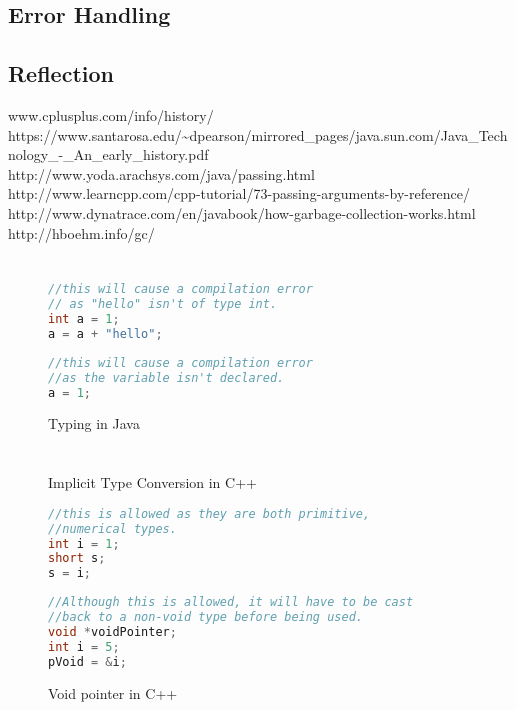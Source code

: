 \documentclass[]{report}
\begin{document}
\section{Error Handling}

\section{Reflection}

\begin{thebibliography}{20}
	www.cplusplus.com/info/history/
	https://www.santarosa.edu/\textasciitilde{}dpearson/mirrored\_pages/java.sun.com/Java\_Technology\_-\_An\_early\_history.pdf
	http://www.yoda.arachsys.com/java/passing.html
	http://www.learncpp.com/cpp-tutorial/73-passing-arguments-by-reference/
	http://www.dynatrace.com/en/javabook/how-garbage-collection-works.html
		http://hboehm.info/gc/
\end{thebibliography}

\appendix
\chapter{}
\begin{figure}[h!]
	\caption{Typing in Java}
	\begin{lstlisting}[language=Java,frame=single]
//this will cause a compilation error
// as "hello" isn't of type int.
int a = 1;
a = a + "hello";
	\end{lstlisting}
	\begin{lstlisting}[language=Java,frame=single]
//this will cause a compilation error
//as the variable isn't declared.
a = 1;
	\end{lstlisting}
\end{figure}

\chapter{}
\begin{figure}[h!]
	\caption{Implicit Type Conversion in C++}
	\begin{lstlisting}[language=C++,frame=single]
//this is allowed as they are both primitive, 
//numerical types.
int i = 1;
short s;
s = i;
	\end{lstlisting}
	\caption{Void pointer in C++}
	\begin{lstlisting}[language=C++,frame=single]
//Although this is allowed, it will have to be cast
//back to a non-void type before being used.
void *voidPointer;
int i = 5;
pVoid = &i; 
	\end{lstlisting}
\end{figure}
\end{document}
